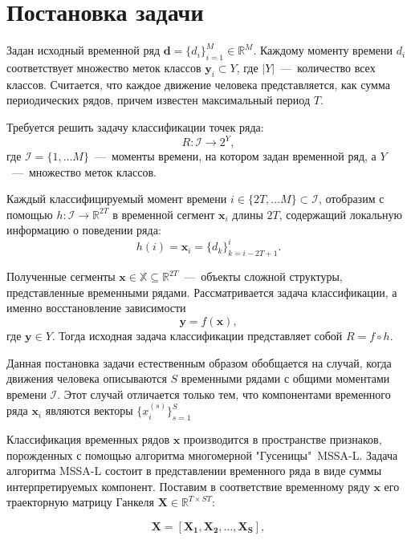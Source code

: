 \documentclass[12pt, twoside]{article}
\begin{document}
\section{Постановка задачи}

Задан исходный временной ряд $\mathbf{d}=\{d_i\}_{i=1}^M\in \mathds{R}^M$. Каждому моменту времени $d_i$ соответствует множество меток классов $\mathbf{y}_i\subset Y$, где $|Y|$~---~количество всех классов. Считается, что каждое движение человека представляется, как сумма периодических рядов, причем известен максимальный период $T$.

Требуется решить задачу классификации точек ряда: $$R:\mathcal{I}\rightarrow 2^Y,$$ где $\mathcal{I}=\{1,\ldots M\}$~---~моменты времени, на котором задан временной ряд, а $Y$~---~множество меток классов.

Каждый классифицируемый момент времени $i\in \{2T,\ldots M\}\subset\mathcal{I}$, отобразим с помощью $h:\mathcal{I}\rightarrow \mathds{R}^{2T}$ в временной сегмент $\mathbf{x}_i$ длины $2T$, содержащий локальную информацию о поведении ряда:
\begin{equation}\label{eq1}
h(i) = \mathbf{x}_i = \{d_k\}_{k=i-2T+1}^{i}.
\end{equation}

Полученные сегменты $\mathbf{x} \in \mathbb{X}\subseteq \mathds{R}^{2T}$~---~объекты сложной структуры, представленные временными рядами. Рассматривается задача классификации, а именно восстановление зависимости $$\mathbf{y}=f(\mathbf{x}),$$ где $\mathbf{y}\in Y$. Тогда исходная задача классификации представляет собой $R=f\circ h$.

Данная постановка задачи естественным образом обобщается на случай, когда движения человека описываются $S$ временными рядами с общими моментами времени $\mathcal{I}$. Этот случай отличается только тем, что компонентами временного ряда $\mathbf{x}_i$ являются векторы $\{x_i^{(s)}\}_{s=1}^S$

Классификация временных рядов $\mathbf{x}$ производится в пространстве признаков, порожденных с помощью алгоритма многомерной "Гусеницы"\ MSSA-L. Задача алгоритма MSSA-L состоит в представлении временного ряда в виде суммы интерпретируемых компонент. Поставим в соответствие временному ряду $\mathbf{x}$ его траекторную матрицу Ганкеля $\mathbf{X}\in \mathds{R}^{T\times ST}$:

\begin{equation}\label{eq3}
\mathbf{X} = [\mathbf{X_1}, \mathbf{X_2},\ldots, \mathbf{X_S}],
\end{equation}
\end{document}
